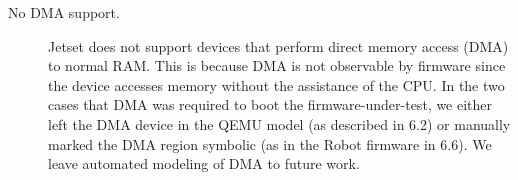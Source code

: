 \begin{description}
\item[No DMA support.] Jetset does not support devices that perform direct memory access (DMA) to normal RAM. This is because DMA is not observable by firmware since the device accesses memory without the assistance of the CPU. In the two cases that DMA was required to boot the firmware-under-test, we either left the DMA device in the QEMU model (as described in 6.2) or manually marked the DMA region symbolic (as in the Robot firmware in 6.6). We leave automated modeling of DMA to future work.
\end{description}
\newpage


